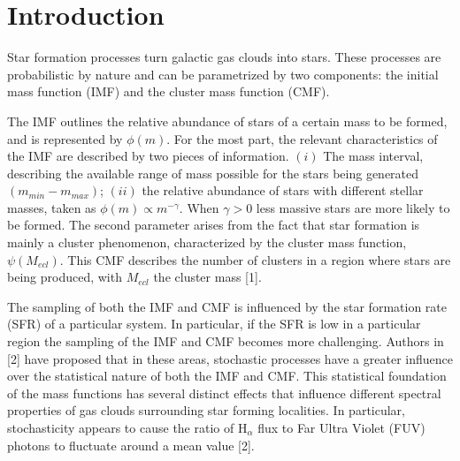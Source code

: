 

\chapter{Introduction}

Star formation processes turn galactic gas clouds into stars. These processes are probabilistic by nature
and can be parametrized by two components: the initial mass function (IMF) and the cluster mass function (CMF).

The IMF outlines the relative abundance of stars of a certain mass to be formed, and is represented by $\phi \left( m \right)$.
For the most part, the relevant characteristics of the IMF are described by two pieces of information. $(i)$ The mass interval,
describing the available range of mass possible for the stars being generated $\left( m_{min} - m_{max} \right)$; $(ii)$ the
relative abundance of stars with different stellar masses, taken as $\phi \left( m \right) \propto m^{-\gamma}$. When $\gamma > 0$
less massive stars are more likely to be formed. The second parameter arises from the fact that star formation is mainly a
cluster phenomenon, characterized by the cluster mass function, $\psi \left( M_{ecl} \right)$. This CMF describes the number of
clusters in a region where stars are being produced, with $M_{ecl}$ the cluster mass [1].


The sampling of both the IMF and CMF is influenced by the star formation rate (SFR) of a particular system. In particular,
if the SFR is low in a particular region the sampling of the IMF and CMF becomes more challenging. Authors in [2] have
proposed that in these areas, stochastic processes have a greater influence over the statistical nature of both the IMF and CMF.
This statistical foundation of the mass functions has several distinct effects that influence different spectral properties of gas
clouds surrounding star forming localities. In particular, stochasticity appears to cause the ratio of H$_{\alpha}$ flux to Far
Ultra Violet (FUV) photons to fluctuate around a mean value [2].

